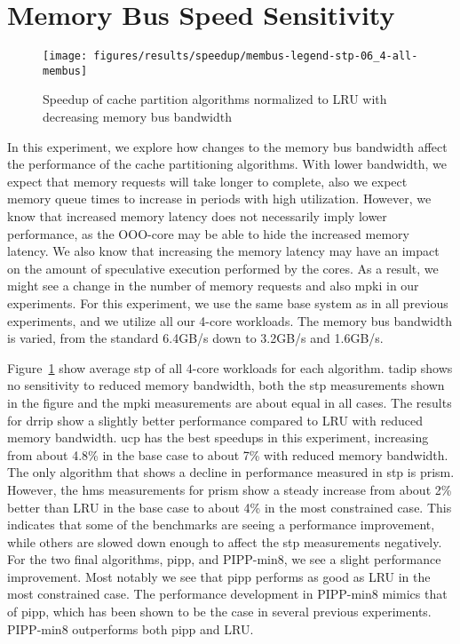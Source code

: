\section{Memory Bus Speed Sensitivity}
\label{sec:results:bus_sensitivity}


\begin{figure}[th]
    \centering
    \texttt{[image: figures/results/speedup/membus-legend-stp-06\_4-all-membus]}
    \caption[Speedup with decreasing bus bandwidth]{Speedup of cache partition algorithms normalized to LRU with decreasing memory bus bandwidth}
    \label{fig:results:bus}
\end{figure}

In this experiment, we explore how changes to the memory bus bandwidth affect the performance of the cache partitioning algorithms.
With lower bandwidth, we expect that memory requests will take longer to complete, also we expect memory queue times to increase in periods with high utilization.
However, we know that increased memory latency does not necessarily imply lower performance, as the OOO-core may be able to hide the increased memory latency.
We also know that increasing the memory latency may have an impact on the amount of speculative execution performed by the cores.
As a result, we might see a change in the number of memory requests and also \gls{mpki} in our experiments.
For this experiment, we use the same base system as in all previous experiments, and we utilize all our 4-core workloads.
The memory bus bandwidth is varied, from the standard 6.4GB/s down to 3.2GB/s and 1.6GB/s.

Figure~\ref{fig:results:bus} show average \gls{stp} of all 4-core workloads for each algorithm.
\gls{tadip} shows no sensitivity to reduced memory bandwidth, both the \gls{stp} measurements shown in the figure and the \gls{mpki} measurements are about equal in all cases.
The results for \gls{drrip} show a slightly better performance compared to LRU with reduced memory bandwidth.
\gls{ucp} has the best speedups in this experiment, increasing from about 4.8\% in the base case to about 7\% with reduced memory bandwidth.
The only algorithm that shows a decline in performance measured in \gls{stp} is \gls{prism}.
However, the \gls{hms} measurements for \gls{prism} show a steady increase from about 2\% better than LRU in the base case to about 4\% in the most constrained case.
This indicates that some of the benchmarks are seeing a performance improvement, while others are slowed down enough to affect the \gls{stp} measurements negatively.
For the two final algorithms, \gls{pipp}, and PIPP-min8, we see a slight performance improvement.
Most notably we see that \gls{pipp} performs as good as LRU in the most constrained case.
The performance development in PIPP-min8 mimics that of \gls{pipp}, which has been shown to be the case in several previous experiments.
PIPP-min8 outperforms both \gls{pipp} and LRU.

